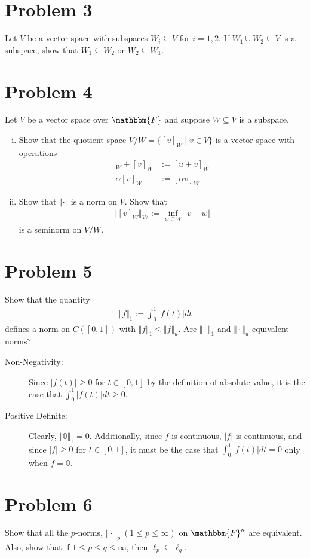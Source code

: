 \documentclass[8pt]{extarticle}
\begin{document}
  \section{Problem 3}%
  Let $V$ be a vector space with subspaces $W_i\subseteq V$ for $i=1,2$. If $W_1\cup W_2\subseteq V$ is a subspace, show that $W_1\subseteq W_2$ or $W_2\subseteq W_1$.
  \section{Problem 4}%
    Let $V$ be a vector space over $\mathbbm{F}$ and suppose $W\subseteq V$ is a subspace.
    \begin{enumerate}[(i)]
      \item Show that the quotient space $V/W = \{[v]_W\mid v\in V\}$ is a vector space with operations
        \begin{align*}
          [u]_W + [v]_W &:=[u+v]_W\\
          \alpha[v]_W &:= [\alpha v]_W
        \end{align*}
      \item Show that $\Vert \cdot \Vert$ is a norm on $V$. Show that
        \begin{align*}
          \Vert [v]_W\Vert_{V/} := \inf_{w\in W}\Vert v-w\Vert
        \end{align*}
        is a seminorm on $V/W$.
    \end{enumerate}
  \section{Problem 5}%
  Show that the quantity
  \begin{align*}
    \Vert f \Vert_1 := \int_{0}^{1}|f(t)| dt
  \end{align*}
  defines a norm on $C([0,1])$ with $\Vert f\Vert_1 \leq \Vert f \Vert_u$. Are $\Vert \cdot \Vert_1$ and $\Vert \cdot \Vert_u$ equivalent norms?
  \begin{description}
    \item[Non-Negativity:] Since $|f(t)| \geq 0$ for $t\in [0,1]$ by the definition of absolute value, it is the case that $\int_{0}^{1}|f(t)|dt\geq 0$.
    \item[Positive Definite:] Clearly, $\Vert \mathbb{0}\Vert_1 = 0$. Additionally, since $f$ is continuous, $|f|$ is continuous, and since $|f| \geq 0$ for $t\in [0,1]$, it must be the case that $\int_{0}^{1}|f(t)|dt = 0$ only when $f = \mathbb{0}$.
  \end{description}
  \section{Problem 6}%
  Show that all the $p$-norms, $\Vert \cdot \Vert_p~(1\leq p \leq \infty)$ on $\mathbbm{F}^n$ are equivalent. Also, show that if $1\leq p \leq q \leq \infty$, then $\ell_p \subseteq \ell_q$.
\end{document}
